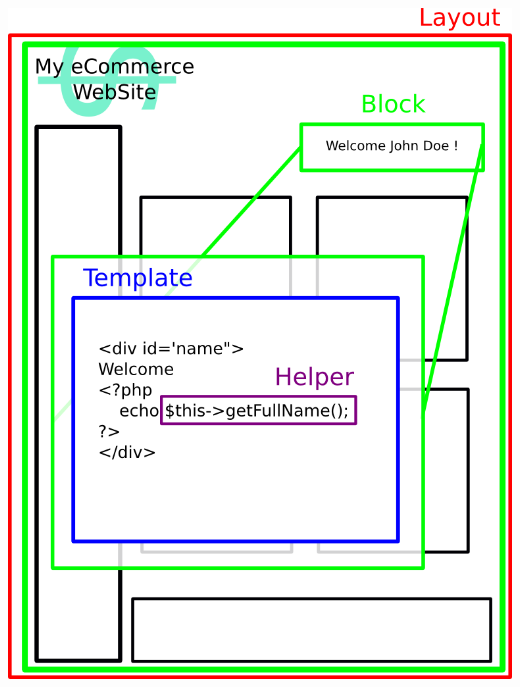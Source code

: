 \documentclass[a4paper,11pt,twoside]{report}
\begin{document}
    \begin{center}
      \includegraphics[width=\textwidth]{images/magento_page_design_structure.png}  
      \label{magento_page_design_structure}
    \end{center}
    
\end{document}
